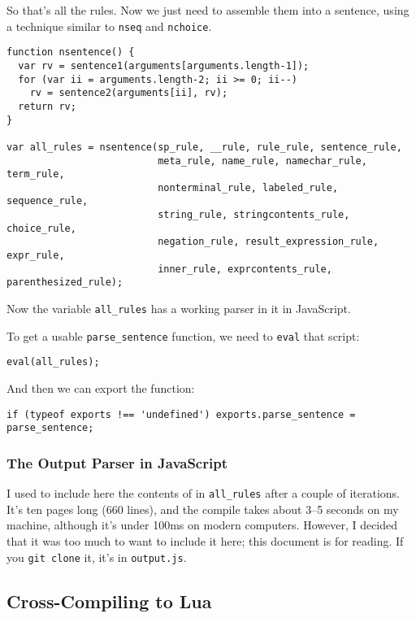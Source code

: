 \documentclass[
]{article}
\begin{document}
So that's all the rules. Now we just need to assemble them into a
sentence, using a technique similar to \texttt{nseq} and
\texttt{nchoice}.

\begin{verbatim}
function nsentence() {
  var rv = sentence1(arguments[arguments.length-1]);
  for (var ii = arguments.length-2; ii >= 0; ii--)
    rv = sentence2(arguments[ii], rv);
  return rv;
}

var all_rules = nsentence(sp_rule, __rule, rule_rule, sentence_rule, 
                          meta_rule, name_rule, namechar_rule, term_rule,
                          nonterminal_rule, labeled_rule, sequence_rule,
                          string_rule, stringcontents_rule, choice_rule,
                          negation_rule, result_expression_rule, expr_rule,
                          inner_rule, exprcontents_rule, parenthesized_rule);
\end{verbatim}

Now the variable \texttt{all\_rules} has a working parser in it in
JavaScript.

To get a usable \texttt{parse\_sentence} function, we need to
\texttt{eval} that script:

\begin{verbatim}
eval(all_rules);
\end{verbatim}

And then we can export the function:

\begin{verbatim}
if (typeof exports !== 'undefined') exports.parse_sentence = parse_sentence;
\end{verbatim}

\hypertarget{the-output-parser-in-javascript}{%
\subsubsection{The Output Parser in
JavaScript}\label{the-output-parser-in-javascript}}

I used to include here the contents of in \texttt{all\_rules} after a
couple of iterations. It's ten pages long (660 lines), and the compile
takes about 3--5 seconds on my machine, although it's under 100ms on
modern computers. However, I decided that it was too much to want to
include it here; this document is for reading. If you
\texttt{git\ clone} it, it's in \texttt{output.js}.

\hypertarget{cross-compiling-to-lua}{%
\subsection{Cross-Compiling to Lua}\label{cross-compiling-to-lua}}
\end{document}
